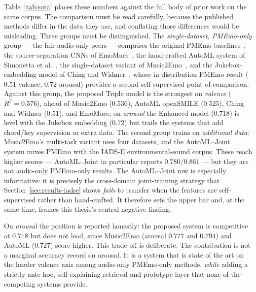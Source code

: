 \documentclass[12pt]{report}
\begin{document}
Table~\ref{tab:sota} places these numbers against the full body of prior work on the same corpus. The comparison must be read carefully, because the published methods differ in the data they use, and conflating those differences would be misleading. Three groups must be distinguished. The \emph{single-dataset, PMEmo-only} group --- the fair audio-only peers --- comprises the original PMEmo baselines~\cite{zhang_pmemo_2018}, the source-separation CNNs of EmoMucs~\cite{deberardinis_emomucs_2020}, the hand-crafted AutoML system of Simonetta et al.~\cite{simonetta_joint_2024}, the single-dataset variant of Music2Emo~\cite{kang_towards_2025}, and the Jukebox-embedding model of Ching and Widmer~\cite{ching_data_2025}, whose in-distribution PMEmo result ($0.51$ valence, $0.72$ arousal) provides a second self-supervised point of comparison. Against this group, the proposed Triple model is the strongest on \emph{valence} ($R^{2}=0.576$), ahead of Music2Emo ($0.536$), AutoML openSMILE ($0.525$), Ching and Widmer ($0.51$), and EmoMucs; on \emph{arousal} the Enhanced model ($0.718$) is level with the Jukebox embedding ($0.72$) but trails the systems that add chord/key supervision or extra data. The second group trains on \emph{additional data}: Music2Emo's multi-task variant uses four datasets, and the AutoML--Joint system mixes PMEmo with the IADS-E environmental-sound corpus. These reach higher scores --- AutoML--Joint in particular reports $0.780/0.861$ --- but they are not audio-only PMEmo-only results. The AutoML--Joint row is especially informative: it is precisely the cross-domain joint-training strategy that Section~\ref{sec:results-iadse} shows \emph{fails} to transfer when the features are self-supervised rather than hand-crafted. It therefore sets the upper bar and, at the same time, frames this thesis's central negative finding.

On \emph{arousal} the position is reported honestly: the proposed system is competitive at $0.718$ but does not lead, since Music2Emo (arousal $0.777$ and $0.794$) and AutoML ($0.727$) score higher. This trade-off is deliberate. The contribution is not a marginal accuracy record on arousal. It is a system that is state of the art on the harder valence axis among audio-only PMEmo-only methods, \emph{while} adding a strictly ante-hoc, self-explaining retrieval and prototype layer that none of the competing systems provide.
\end{document}
